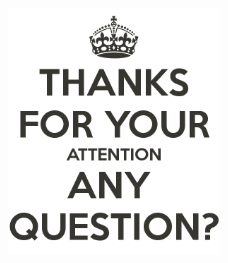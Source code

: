 \documentclass{beamer}
\begin{document}
	\begin{frame}
		\begin{figure}[p]
			\centering
			\includegraphics[width=0.5\textwidth]{thanks.png}
		\end{figure}
	\end{frame}
\end{document}
